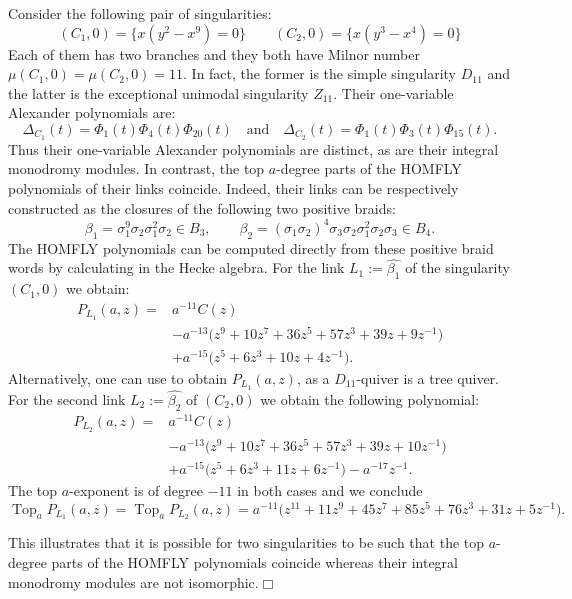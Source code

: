 \begin{example}\label{ex:singularity_pair_2} Consider the following pair of singularities:
\[
(C_1,0)=\{x(y^2-x^9)=0\}
 \qquad
(C_2,0)=\{x(y^3-x^4)=0\}
\]
\noindent Each of them has two branches and they both have Milnor number $\mu(C_1,0)=\mu(C_2,0)=11$. In fact, the former is the simple singularity $D_{11}$ and the latter is the exceptional unimodal singularity $Z_{11}$. Their one-variable Alexander polynomials are:
\[
 \Delta_{C_1}(t)=\Phi_1(t)\Phi_4(t)\Phi_{20}(t)
 \quad\text{and}\quad
 \Delta_{C_2}(t)=\Phi_1(t)\Phi_3(t)\Phi_{15}(t).
\]
Thus their one-variable Alexander polynomials are distinct, as are their integral monodromy modules. In contrast, the top $a$-degree parts of the HOMFLY polynomials of their links coincide. Indeed, their links can be respectively constructed as the closures of the following two positive braids:
\[
 \beta_1=\sigma_1^9\sigma_2\sigma_1^2\sigma_2\in B_3,
 \qquad
 \beta_2=(\sigma_1\sigma_2)^4
 \sigma_3\sigma_2\sigma_1^2\sigma_2\sigma_3\in B_4. 
\]
\noindent The HOMFLY polynomials can be computed directly from these positive braid words by calculating in the Hecke algebra. For the link $L_1:=\widehat{\beta_1}$ of the singularity $(C_1,0)$ we obtain:
\[
 \begin{aligned}
 P_{L_1}(a,z)={}&a^{-11}C(z)\\
 &-a^{-13}\bigl(z^9+10z^7+36z^5+57z^3+39z+9z^{-1}\bigr)\\
 &+a^{-15}\bigl(z^5+6z^3+10z+4z^{-1}\bigr).
 \end{aligned}                                         
\]
Alternatively, one can use \cite[Theorem~3.11]{Schwartz} to obtain $P_{L_1}(a,z)$, as a $D_{11}$-quiver is a tree quiver. For the second link $L_2:=\widehat{\beta_2}$ of $(C_2,0)$ we obtain the following polynomial:
\[
 \begin{aligned}
 P_{L_2}(a,z)={}&a^{-11}C(z)\\
 &-a^{-13}\bigl(z^9+10z^7+36z^5+57z^3+39z+10z^{-1}\bigr)\\
 &+a^{-15}\bigl(z^5+6z^3+11z+6z^{-1}\bigr)-a^{-17}z^{-1}.
 \end{aligned}                                        
\]
The top $a$-exponent is of degree $-11$ in both cases and we conclude
\[
 \boxed{
 \operatorname{Top}_a P_{L_1}(a,z)
 =\operatorname{Top}_a P_{L_2}(a,z)
 =a^{-11}\bigl(z^{11}+11z^9+45z^7+85z^5+76z^3+31z+5z^{-1}\bigr).}
\]

\noindent This illustrates that it is possible for two singularities to be such that the top $a$-degree parts of the HOMFLY polynomials coincide whereas their integral monodromy modules are not isomorphic.\hfill$\Box$
\end{example}

